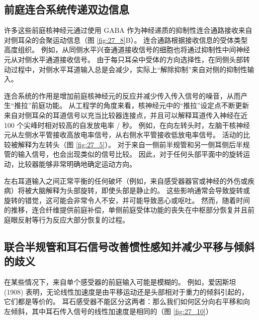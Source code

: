 \subsection{前庭连合系统传递双边信息}

许多这些前庭核神经元通过使用 GABA 作为神经递质的抑制性连合通路接收来自对侧耳朵的会聚运动信息（图 \ref{fig:27_8}B）。
连合通路根据接收信息的受体类型高度组织。
例如，从同侧水平兴奋通道接收信号的细胞也将通过抑制性中间神经元从对侧水平通道接收信号。
由于每只耳朵中受体的方向选择性，在同侧头部转动过程中，对侧水平耳道输入总是会减少，实际上“解除抑制”来自对侧的抑制性输入。


连合系统的作用是增加前庭核神经元的反应并减少传入传入信号的噪音，从而产生“推拉”前庭功能。
从工程学的角度来看，核神经元中的“推拉”设定点不断更新来自对侧耳朵的耳道信号以充当比较器连接点，并且可以解释耳道传入神经在近 100 个尖峰时相对较高的自发放电率 / 秒。
例如，在向左转头时，左脑干核神经元从左侧水平管接收高放电率信号，从右侧水平管接收低放电率信号。
活动的比较被解释为左转头（图 \ref{fig:27_5}）。
对于来自一侧前半规管和另一侧耳侧后半规管的输入信号，也会出现类似的信号比较。
因此，对于任何头部平面中的旋转运动，比较器能够非常明确地确定运动方向。


左右耳道输入之间正常平衡的任何破坏（例如，来自感受器器官或神经的外伤或疾病）将被大脑解释为头部旋转，即使头部是静止的。
这些影响通常会导致旋转或旋转的错觉，这可能会非常令人不安，并可能导致恶心或呕吐。
然而，随着时间的推移，连合纤维提供前庭补偿，单侧前庭受体功能的丧失在中枢部分恢复并且前庭眼反射等行为反应大部分恢复的过程。



\subsection{联合半规管和耳石信号改善惯性感知并减少平移与倾斜的歧义}

在某些情况下，来自单个感受器的前庭输入可能是模糊的。
例如，爱因斯坦 (1908) 表明，无论线性加速度是由平移运动还是头部相对于重力的倾斜引起的，它们都是等价的。
耳石感受器不能区分这两者：那么我们如何区分向右平移和向左倾斜，其中耳石传入信号的线性加速度是相同的（图 \ref{fig:27_10}）



